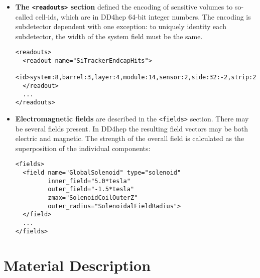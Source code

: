 \begin{itemize}
\item {\textbf{The \texttt{<readouts>} section}} defined the encoding of sensitive volumes to so-called cell-ids, which are in DD4hep 64-bit integer numbers. The encoding is subdetector dependent with one exception: to uniquely identity each subdetector, the width of the system field must be the same.
\begin{verbatim}
<readouts>
  <readout name="SiTrackerEndcapHits">
    <id>system:8,barrel:3,layer:4,module:14,sensor:2,side:32:-2,strip:20</id>
  </readout>
  ...
</readouts>
\end{verbatim}

\item {\textbf{Electromagnetic fields}} are described in the \texttt{<fields>} section. There may be several fields present. In DD4hep the resulting field vectors
may be both electric and magnetic. The strength of the overall field is calculated as the superposition of the individual components:
\begin{verbatim}
<fields>
  <field name="GlobalSolenoid" type="solenoid" 
         inner_field="5.0*tesla"
         outer_field="-1.5*tesla" 
         zmax="SolenoidCoilOuterZ"
         outer_radius="SolenoidalFieldRadius">
  </field>
  ...
</fields>
\end{verbatim}
\end{itemize}

\section{Material Description}
\label{sec:compact-material-description}

